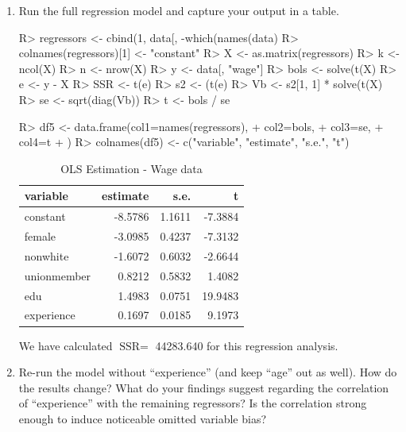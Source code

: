 \documentclass[11pt,reqno]{article}   %
\newcommand{\ksp}{\vspace{0.1in}}   %
\begin{document}
\begin{enumerate}
\item
Run the full regression model and capture your output in a table.

\begin{Schunk}
\begin{Sinput}
R> regressors <- cbind(1, data[, -which(names(data) %
R> colnames(regressors)[1] <- "constant"
R> X <- as.matrix(regressors)
R> k <- ncol(X)
R> n <- nrow(X)
R> y <- data[, "wage"]
R> bols <- solve(t(X) %
R> e <- y - X %
R> SSR <- t(e) %
R> s2 <- (t(e) %
R> Vb <- s2[1, 1] * solve(t(X) %
R> se <- sqrt(diag(Vb))
R> t <- bols / se
\end{Sinput}
\end{Schunk}

\begin{Schunk}
\begin{Sinput}
R> df5 <- data.frame(col1=names(regressors),
+                  col2=bols,
+                  col3=se,
+                  col4=t
+                  )
R> colnames(df5) <- c("variable", "estimate", "s.e.", "t")
\end{Sinput}
\end{Schunk}

\begin{table}[!h]
\centering
\caption{OLS Estimation - Wage data} 
\begin{tabular}{lrrr}
  \hline
variable & estimate & s.e. & t \\ 
  \hline
constant & -8.5786 & 1.1611 & -7.3884 \\ 
  female & -3.0985 & 0.4237 & -7.3132 \\ 
  nonwhite & -1.6072 & 0.6032 & -2.6644 \\ 
  unionmember & 0.8212 & 0.5832 & 1.4082 \\ 
  edu & 1.4983 & 0.0751 & 19.9483 \\ 
  experience & 0.1697 & 0.0185 & 9.1973 \\ 
   \hline
\end{tabular}
\end{table}

We have calculated $\text{SSR} = $ 44283.640 for this regression analysis. 
\ksp
\item
Re-run the model without ``experience'' (and keep ``age'' out as well).  How do the results change?
What do your findings suggest regarding the correlation of ``experience'' with the remaining regressors?
Is the correlation strong enough to induce noticeable omitted variable bias?


\end{enumerate}
\end{document}
